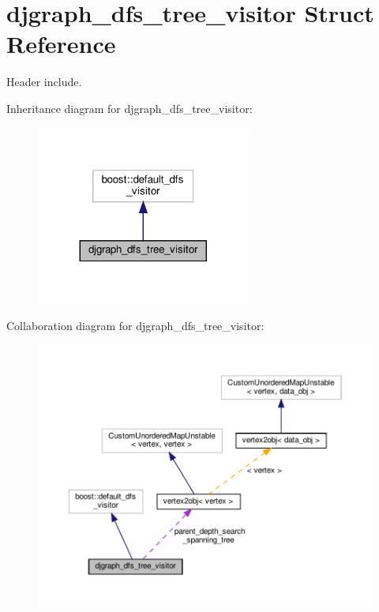 \hypertarget{structdjgraph__dfs__tree__visitor}{}\section{djgraph\+\_\+dfs\+\_\+tree\+\_\+visitor Struct Reference}
\label{structdjgraph__dfs__tree__visitor}


Header include.  




Inheritance diagram for djgraph\+\_\+dfs\+\_\+tree\+\_\+visitor\+:
\nopagebreak
\begin{figure}[H]
\begin{center}
\leavevmode
\includegraphics[width=200pt]{da/db8/structdjgraph__dfs__tree__visitor__inherit__graph}
\end{center}
\end{figure}


Collaboration diagram for djgraph\+\_\+dfs\+\_\+tree\+\_\+visitor\+:
\nopagebreak
\begin{figure}[H]
\begin{center}
\leavevmode
\includegraphics[width=350pt]{d4/d56/structdjgraph__dfs__tree__visitor__coll__graph}
\end{center}
\end{figure}

